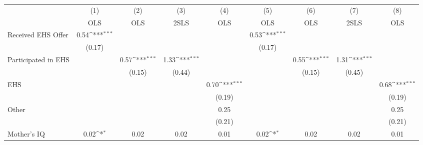{
\def\sym#1{\ifmmode^{#1}\else\(^{#1}\)\fi}
\begin{tabular}{l*{8}{c}}
\hline\hline
                    &\multicolumn{1}{c}{(1)}&\multicolumn{1}{c}{(2)}&\multicolumn{1}{c}{(3)}&\multicolumn{1}{c}{(4)}&\multicolumn{1}{c}{(5)}&\multicolumn{1}{c}{(6)}&\multicolumn{1}{c}{(7)}&\multicolumn{1}{c}{(8)}\\
                    &\multicolumn{1}{c}{OLS}&\multicolumn{1}{c}{OLS}&\multicolumn{1}{c}{2SLS}&\multicolumn{1}{c}{OLS}&\multicolumn{1}{c}{OLS}&\multicolumn{1}{c}{OLS}&\multicolumn{1}{c}{2SLS}&\multicolumn{1}{c}{OLS}\\
\hline
Received EHS Offer  &        0.54\sym{***}&                     &                     &                     &        0.53\sym{***}&                     &                     &                     \\
                    &      (0.17)         &                     &                     &                     &      (0.17)         &                     &                     &                     \\
[1em]
Participated in EHS &                     &        0.57\sym{***}&        1.33\sym{***}&                     &                     &        0.55\sym{***}&        1.31\sym{***}&                     \\
                    &                     &      (0.15)         &      (0.44)         &                     &                     &      (0.15)         &      (0.45)         &                     \\
[1em]
EHS                 &                     &                     &                     &        0.70\sym{***}&                     &                     &                     &        0.68\sym{***}\\
                    &                     &                     &                     &      (0.19)         &                     &                     &                     &      (0.19)         \\
[1em]
Other               &                     &                     &                     &        0.25         &                     &                     &                     &        0.25         \\
                    &                     &                     &                     &      (0.21)         &                     &                     &                     &      (0.21)         \\
[1em]
Mother's IQ         &        0.02\sym{*}  &        0.02         &        0.02         &        0.01         &        0.02\sym{*}  &        0.02         &        0.02         &        0.01         \\

\end{tabular}}
